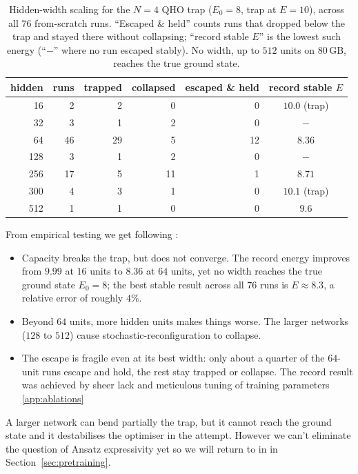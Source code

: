 \documentclass[a4paper,11pt,twoside]{article}
\begin{document}
\begin{table}[H]
    \centering
    \begin{tabular}{r r r r r c}
        \hline
        hidden & runs & trapped & collapsed & escaped \& held & record stable $E$ \\
        \hline
        16  & 2  & 2  & 0  & 0  & $10.0$ (trap) \\
        32  & 3  & 1  & 2  & 0  & $-$ \\
        64  & 46 & 29 & 5  & 12 & $\mathbf{8.36}$ \\
        128 & 3  & 1  & 2  & 0  & $-$ \\
        256 & 17 & 5  & 11 & 1  & $8.71$ \\
        300 & 4  & 3  & 1  & 0  & $10.1$ (trap) \\
        512 & 1  & 1  & 0  & 0  & $9.6$ \\
        \hline
    \end{tabular}
    \caption{Hidden-width scaling for the $N=4$ QHO trap ($E_0 = 8$, trap at $E = 10$), across all $76$ from-scratch runs. ``Escaped \& held'' counts runs that dropped below the trap and stayed there without collapsing; ``record stable $E$'' is the lowest such energy (``$-$'' where no run escaped stably). No width, up to $512$ units on $80$\,GB, reaches the true ground state.}
    \label{tab:width_scaling}
\end{table}

From empirical testing we get following : 
\begin{itemize}
    \item Capacity breaks the trap, but does not converge. The record energy improves from $9.99$ at $16$ units to $8.36$ at $64$ units, yet no width reaches the true ground state $E_0 = 8$; the best stable result across all $76$ runs is $E \approx 8.3$, a relative error of roughly $4\%$.
    \item Beyond $64$ units, more hidden units makes things worse. The larger networks ($128$ to $512$) cause stochastic-reconfiguration to collapse.
    \item The escape is fragile even at its best width: only about a quarter of the $64$-unit runs escape and hold, the rest stay trapped or collapse. The record result was achieved by sheer lack and meticulous tuning of training parameters \ref{app:ablations}
\end{itemize}

A larger network can bend partially the trap, but it cannot reach the ground state and it destabilises the optimiser in the attempt. However we can't eliminate the question of Ansatz expressivity yet so we will return to in in Section~\ref{sec:pretraining}.
\end{document}
